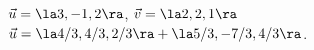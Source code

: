 {$\vec u = \la 3,-1,2\ra$, $\vec v = \la 2,2,1\ra$
}
{$\vec u = \la 4/3,4/3,2/3\ra + \la 5/3,-7/3,4/3\ra$.
}
